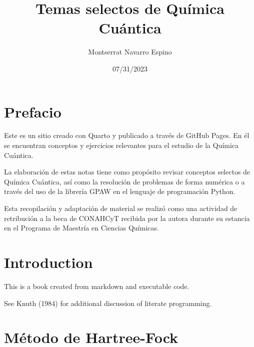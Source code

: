 \documentclass[
  letterpaper,
  DIV=11,
  numbers=noendperiod]{scrreprt}
\title{Temas selectos de Química Cuántica}
\author{Montserrat Navarro Espino}
\date{07/31/2023}
\renewcommand*\contentsname{Table of contents}
\newcommand\contentsname{Table of contents}
\begin{document}
\maketitle
\ifdefined\Shaded\renewenvironment{Shaded}{\begin{tcolorbox}[frame hidden, boxrule=0pt, borderline west={3pt}{0pt}{shadecolor}, interior hidden, enhanced, breakable, sharp corners]}{\end{tcolorbox}}\fi

\renewcommand*\contentsname{Table of contents}
{
\hypersetup{linkcolor=}
\setcounter{tocdepth}{2}
\tableofcontents
}

\hypertarget{prefacio}{%
\chapter*{Prefacio}\label{prefacio}}

Este es un sitio creado con Quarto y publicado a través de GitHub Pages.
En él se encuentran conceptos y ejercicios relevantes para el estudio de
la Química Cuántica.

La elaboración de estas notas tiene como propósito revisar conceptos
selectos de Química Cuántica, así como la resolución de problemas de
forma numérica o a través del uso de la librería GPAW en el lenguaje de
programación Python.

Esta recopilación y adaptación de material se realizó como una actividad
de retribución a la beca de CONAHCyT recibida por la autora durante su
estancia en el Programa de Maestría en Ciencias Químicas.


\hypertarget{introduction}{%
\chapter{Introduction}\label{introduction}}

This is a book created from markdown and executable code.

See Knuth (1984) for additional discussion of literate programming.


\hypertarget{muxe9todo-de-hartree-fock}{%
\chapter{Método de Hartree-Fock}\label{muxe9todo-de-hartree-fock}}
\end{document}
